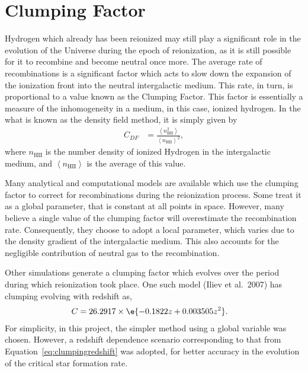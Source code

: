 
\section{Clumping Factor} %
\label{sec:clumping_factor}
	Hydrogen which already has been reionized may still play a significant role in the evolution of the Universe during the epoch of reionization, as it is still possible for it to recombine and become neutral once more. The average rate of recombinations is a significant factor which acts to slow down the expansion of the ionization front into the neutral intergalactic medium. This rate, in turn, is proportional to a value known as the Clumping Factor. This factor is essentially a measure of the inhomogeneity in a medium, in this case, ionized hydrogen. In the what is known as the density field method, it is simply given by
	\begin{align}
		C_{DF} &=\frac{\left \langle n_\text{HII}^2 \right \rangle}{\left \langle n_\text{HII} \right \rangle^2}, \label{eq:clumpingnHII}
	\end{align}
	where $n_\text{HII}$ is the number density of ionized Hydrogen in the intergalactic medium, and $\left \langle n_\text{HII} \right \rangle$ is the average of this value\cite{2012ApJ...747..100S}.

	Many analytical and computational models are available which use the clumping factor to correct for recombinations during the reionization process. Some treat it as a global parameter, that is constant at all points in space. However, many believe a single value of the clumping factor will overestimate the recombination rate. Consequently, they choose to adopt a local parameter, which varies due to the density gradient of the intergalactic medium. This also accounts for the negligible contribution of neutral gas to the recombination\cite{MNL2:MNL2993}.

	Other simulations generate a clumping factor which evolves over the period during which reionization took place. One such model (Iliev et al.~2007) has clumping evolving with redshift as\cite{Pawlik21042009},
	\begin{align}
		C &=26.2917\times \e{-0.1822z+0.003505z^2}. \label{eq:clumpingredshift}
	\end{align}
	For simplicity, in this project, the simpler method using a global variable was chosen. However, a redshift dependence scenario corresponding to that from Equation~\ref{eq:clumpingredshift} was adopted, for better accuracy in the evolution of the critical star formation rate.
